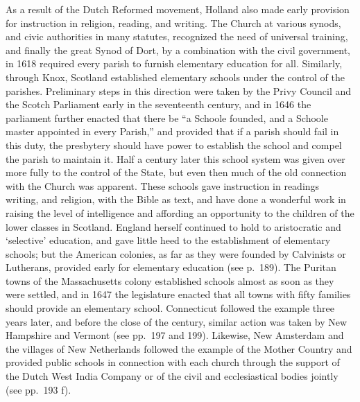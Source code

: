\documentclass[]{book}
\begin{document}
As a result of the Dutch Reformed movement, Holland also made early provision for instruction in religion, reading, and writing. The Church at various synods, and civic authorities in many statutes, recognized the need of universal training, and finally the great Synod of Dort, by a combination with the civil government, in 1618 required every parish to furnish elementary education for all. Similarly, through Knox, Scotland established elementary schools under the control of the parishes. Preliminary steps in this direction were taken by the Privy Council and the Scotch Parliament early in the seventeenth century, and in 1646 the parliament further enacted that there be ``a Schoole founded, and a Schoole master appointed in every Parish,'' and provided that if a parish should fail in this duty, the presbytery should have power to establish the school and compel the parish to maintain it. Half a century later this school system was given over more fully to the control of the State, but even then much of the old connection with the Church was apparent. These schools gave instruction in readings writing, and religion, with the Bible as text, and have done a wonderful work in raising the level of intelligence and affording an opportunity to the children of the lower classes in Scotland. England herself continued to hold to aristocratic and `selective' education, and gave little heed to the establishment of elementary schools; but the American colonies, as far as they were founded by Calvinists or Lutherans, provided early for elementary education (see p.~189). The Puritan towns of the Massachusetts colony established schools almost as soon as they were settled, and in 1647 the legislature enacted that all towns with fifty families should provide an elementary school. Connecticut followed the example three years later, and before the close of the century, similar action was taken by New Hampshire and Vermont (see pp.~197 and 199). Likewise, New Amsterdam and the villages of New Netherlands followed the example of the Mother Country and provided public schools in connection with each church through the support of the Dutch West India Company or of the civil and ecclesiastical bodies jointly (see pp.~193 f).
\end{document}
